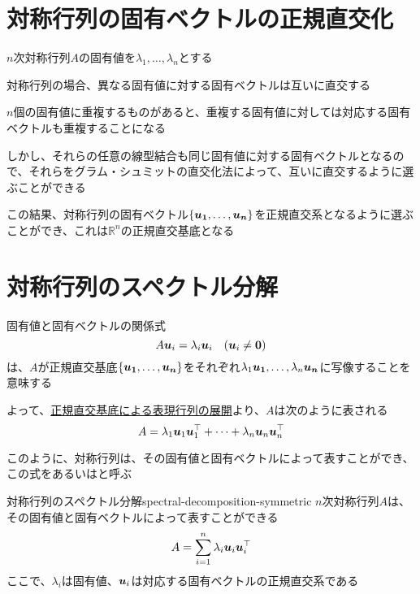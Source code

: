 \documentclass[../../../topic_linear-algebra]{subfiles}
\begin{document}
\sectionline
\section{対称行列の固有ベクトルの正規直交化}\label{sec:orthogonalization-eigenvectors-symmetric}

$n$次対称行列$A$の固有値を$\lambda_1,\ldots,\lambda_n$とする

対称行列の場合、異なる固有値に対する固有ベクトルは互いに直交する

\br

$n$個の固有値に重複するものがあると、重複する固有値に対しては対応する固有ベクトルも重複することになる

しかし、それらの任意の線型結合も同じ固有値に対する固有ベクトルとなるので、それらをグラム・シュミットの直交化法によって、互いに直交するように選ぶことができる

\br

この結果、対称行列の固有ベクトル$\{ \vb*{u_1}, \ldots, \vb*{u_n} \}$を正規直交系となるように選ぶことができ、これは$\mathbb{R}^n$の正規直交基底となる

\sectionline
\section{対称行列のスペクトル分解}

固有値と固有ベクトルの関係式
\begin{equation*}
  A\vb*{u}_i = \lambda_i\vb*{u}_i \quad (\vb*{u}_i \neq \vb*{0})
\end{equation*}
は、$A$が正規直交基底$\{ \vb*{u_1}, \ldots, \vb*{u_n} \}$をそれぞれ$\lambda_1 \vb*{u_1}, \ldots, \lambda_n \vb*{u_n}$に写像することを意味する

\br

よって、\hyperref[thm:orthobasis-formula-for-rep-matrix]{正規直交基底による表現行列の展開}より、$A$は次のように表される
\begin{equation*}
  A = \lambda_1 \vb*{u}_1 \vb*{u}_1^\top + \cdots + \lambda_n \vb*{u}_n \vb*{u}_n^\top
\end{equation*}

このように、対称行列は、その固有値と固有ベクトルによって表すことができ、この式をあるいはと呼ぶ

\begin{theorem}{対称行列のスペクトル分解}{spectral-decomposition-symmetric}
  $n$次対称行列$A$は、その固有値と固有ベクトルによって表すことができる
  \begin{equation*}
    A = \sum_{i=1}^n \lambda_i \vb*{u}_i \vb*{u}_i^\top
  \end{equation*}
  ここで、$\lambda_i$は固有値、$\vb*{u}_i$は対応する固有ベクトルの正規直交系である
\end{theorem}
\end{document}
